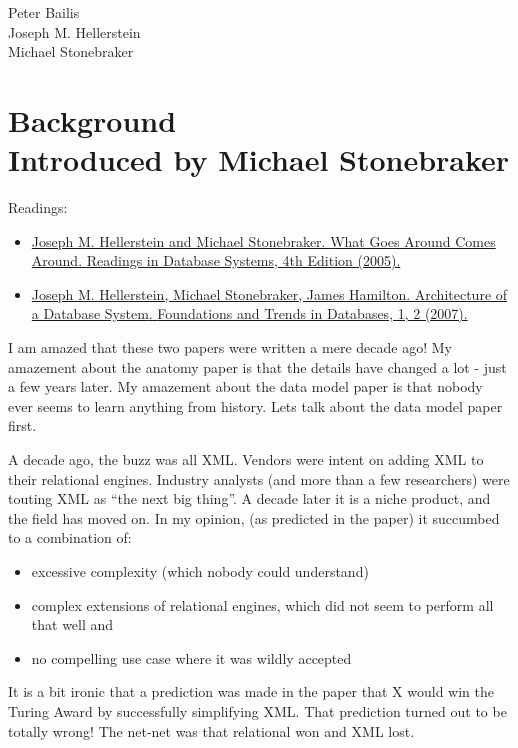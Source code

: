 \documentclass[b5paper,11pt,twoside,openright]{book}
\newcommand\Chapter[3]{
  \hypertarget{#1}{
    \chapter[#2]{#2\\{\Large #3}}
  }
}
\begin{document}
\enlargethispage{2\baselineskip}
Peter Bailis\\
Joseph M. Hellerstein\\
Michael Stonebraker\\


\Chapter{ch1-background}{Background}{%
  Introduced by Michael Stonebraker}

\begin{framed}
Readings:

\begin{itemize}
  \item
  \href{https://scholar.google.com/scholar?cluster=7366182905777149494}{Joseph
    M. Hellerstein and Michael Stonebraker. {What Goes Around Comes Around}.
    {Readings in Database Systems}, 4th Edition (2005).}
  \item
  \href{https://scholar.google.com/scholar?cluster=11466590537214723805}{Joseph
    M. Hellerstein, Michael Stonebraker, James Hamilton. {Architecture of a
      Database System}. {Foundations and Trends in Databases}, 1, 2 (2007).}
\end{itemize}
\end{framed}

I am amazed that these two papers were written a mere decade ago! My
amazement about the anatomy paper is that the details have changed a lot
- just a few years later. My amazement about the data model paper is
that nobody ever seems to learn anything from history. Lets talk about
the data model paper first.

A decade ago, the buzz was all XML. Vendors were intent on adding XML to
their relational engines. Industry analysts (and more than a few
researchers) were touting XML as ``the next big thing''. A decade later
it is a niche product, and the field has moved on. In my opinion, (as
predicted in the paper) it succumbed to a combination of:

\begin{itemize}
  \item
  excessive complexity (which nobody could understand)
  \item
  complex extensions of relational engines, which did not seem to
  perform all that well and
  \item
  no compelling use case where it was wildly accepted
\end{itemize}

It is a bit ironic that a prediction was made in the paper that X would
win the Turing Award by successfully simplifying XML. That prediction
turned out to be totally wrong! The net-net was that relational won and
XML lost.
\end{document}
